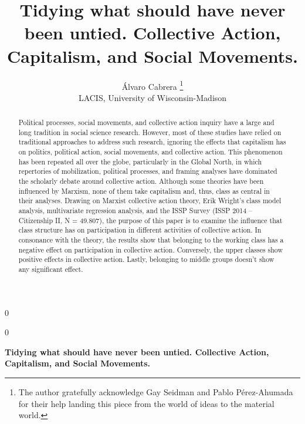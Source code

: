 \documentclass[12pt]{article}
\newcommand{\blind}{0}
\begin{document}
\def\spacingset#1{\renewcommand{\baselinestretch}%
{#1}\small\normalsize} \spacingset{1}



\blind
{
  \title{\bf Tidying what should have never been untied. Collective
Action, Capitalism, and Social Movements.}

  \author{
        Álvaro Cabrera \thanks{The author gratefully acknowledge Gay
Seidman and Pablo Pérez-Ahumada for their help landing this piece from
the world of ideas to the material world.} \\
    LACIS, University of Wisconsin-Madison\\
      }
  \maketitle
} \fi

\blind
{
  \bigskip
  \bigskip
  \bigskip
  \begin{center}
    {\LARGE\bf Tidying what should have never been untied. Collective
Action, Capitalism, and Social Movements.}
  \end{center}
  \medskip
} \fi

\bigskip
\begin{abstract}
Political processes, social movements, and collective action inquiry
have a large and long tradition in social science research. However,
most of these studies have relied on traditional approaches to address
such research, ignoring the effects that capitalism has on politics,
political action, social movements, and collective action. This
phenomenon has been repeated all over the globe, particularly in the
Global North, in which repertories of mobilization, political processes,
and framing analyses have dominated the scholarly debate around
collective action. Although some theories have been influenced by
Marxism, none of them take capitalism and, thus, class as central in
their analyses. Drawing on Marxist collective action theory, Erik
Wright's class model analysis, multivariate regression analysis, and the
ISSP Survey (ISSP 2014 -- Citizenship II, N = 49.807), the purpose of
this paper is to examine the influence that class structure has on
participation in different activities of collective action. In
consonance with the theory, the results show that belonging to the
working class has a negative effect on participation in collective
action. Conversely, the upper classes show positive effects in
collective action. Lastly, belonging to middle groups doesn't show any
significant effect.
\end{abstract}
\end{document}
